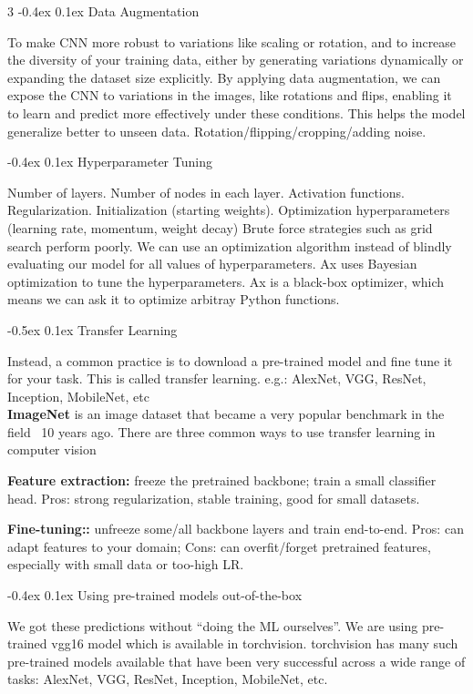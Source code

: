\documentclass[8pt,landscape]{article}
\makeatletter
\renewcommand{\section}{\@startsection{section}{1}{0pt}%
    {-0.5ex}%
    {0.1ex}%
    {\fontsize{8}{9}\bfseries\color{red}}}
\renewcommand{\subsection}{\@startsection{subsection}{2}{0pt}%
    {-0.4ex}%
    {0.1ex}%
    {\fontsize{8}{9}\bfseries\color{blue}}}
\newcommand{\smalltext}[1]{%
  {\fontsize{8}{9}\selectfont\sloppy #1\par}%
}
\makeatother
\begin{document}
\begin{multicols}{3}
\subsection{Data Augmentation}
\smalltext{
To make CNN more robust to variations like scaling or rotation, and to increase the diversity of your training data, either by generating variations dynamically or expanding the dataset size explicitly.
By applying data augmentation, we can expose the CNN to variations in the images, like rotations and flips, enabling it to learn and predict more effectively under these conditions. This helps the model generalize better to unseen data. Rotation/flipping/cropping/adding noise.
}
\subsection{Hyperparameter Tuning}
\smalltext{
    Number of layers. Number of nodes in each layer. Activation functions. Regularization. Initialization (starting weights). Optimization hyperparameters (learning rate, momentum, weight decay)
    Brute force strategies such as grid search perform poorly. 
    We can use an optimization algorithm instead of blindly evaluating our model for all values of hyperparameters.
    Ax uses Bayesian optimization to tune the hyperparameters. Ax is a black-box optimizer, which means we can ask it to optimize arbitray Python functions. 
}

\section{Transfer Learning}
\smalltext{
Instead, a common practice is to download a pre-trained model and fine tune it for your task. This is called transfer learning.
e.g.: AlexNet, VGG, ResNet, Inception, MobileNet, etc \\
\textbf{ImageNet} is an image dataset that became a very popular benchmark in the field ~10 years ago.
There are three common ways to use transfer learning in computer vision

\textbf{Feature extraction:}
freeze the pretrained backbone; train a small classifier head.
Pros: strong regularization, stable training, good for small datasets.

\textbf{Fine-tuning::}
unfreeze some/all backbone layers and train end-to-end.
Pros: can adapt features to your domain; Cons: can overfit/forget pretrained features, especially with small data or too-high LR.
}
\subsection{Using pre-trained models out-of-the-box}
\smalltext{
We got these predictions without “doing the ML ourselves”.
We are using pre-trained vgg16 model which is available in torchvision.
torchvision has many such pre-trained models available that have been very successful across a wide range of tasks: AlexNet, VGG, ResNet, Inception, MobileNet, etc.
}


\end{multicols}
\end{document}
